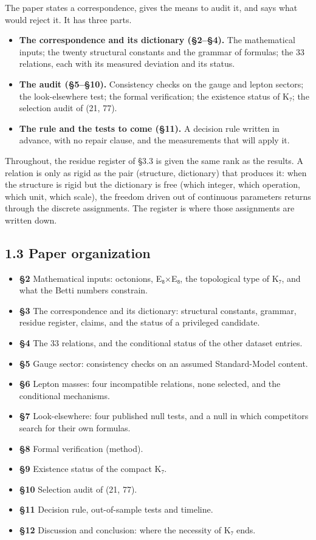 \documentclass[11pt,a4paper]{article}
\begin{document}
The paper states a correspondence, gives the means to audit it, and says what would reject it. It has three parts.

\begin{itemize}
\tightlist
\item
  \textbf{The correspondence and its dictionary (§2--§4).} The mathematical inputs; the twenty structural constants and the grammar of formulas; the 33 relations, each with its measured deviation and its status.
\item
  \textbf{The audit (§5--§10).} Consistency checks on the gauge and lepton sectors; the look-elsewhere test; the formal verification; the existence status of K₇; the selection audit of (21, 77).
\item
  \textbf{The rule and the tests to come (§11).} A decision rule written in advance, with no repair clause, and the measurements that will apply it.
\end{itemize}

Throughout, the residue register of §3.3 is given the same rank as the results. A relation is only as rigid as the pair (structure, dictionary) that produces it: when the structure is rigid but the dictionary is free (which integer, which operation, which unit, which scale), the freedom driven out of continuous parameters returns through the discrete assignments. The register is where those assignments are written down.

\subsection{1.3 Paper organization}\label{paper-organization}

\begin{itemize}
\tightlist
\item
  \textbf{§2} Mathematical inputs: octonions, E₈×E₈, the topological type of K₇, and what the Betti numbers constrain.
\item
  \textbf{§3} The correspondence and its dictionary: structural constants, grammar, residue register, claims, and the status of a privileged candidate.
\item
  \textbf{§4} The 33 relations, and the conditional status of the other dataset entries.
\item
  \textbf{§5} Gauge sector: consistency checks on an assumed Standard-Model content.
\item
  \textbf{§6} Lepton masses: four incompatible relations, none selected, and the conditional mechanisms.
\item
  \textbf{§7} Look-elsewhere: four published null tests, and a null in which competitors search for their own formulas.
\item
  \textbf{§8} Formal verification (method).
\item
  \textbf{§9} Existence status of the compact K₇.
\item
  \textbf{§10} Selection audit of (21, 77).
\item
  \textbf{§11} Decision rule, out-of-sample tests and timeline.
\item
  \textbf{§12} Discussion and conclusion: where the necessity of K₇ ends.
\end{itemize}
\end{document}
